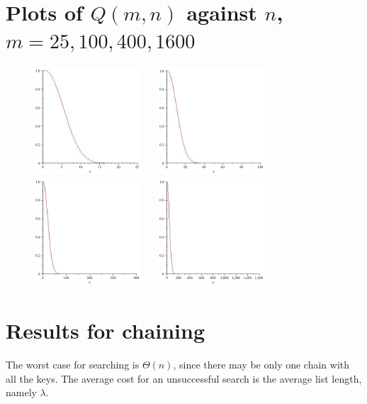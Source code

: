 \section{Plots of $Q(m, n)$ against $n$, $m=25,100,400,1600$}
\begin{figure}[htb]
\centering
\includegraphics[width=4cm]{figs/birthday25.jpg}
$\quad$
\includegraphics[width=4cm]{figs/birthday100.jpg}\\
\includegraphics[width=4cm]{figs/birthday400.jpg}
$\quad$
\includegraphics[width=4cm]{figs/birthday1600.jpg}
\end{figure}

\section{Results for chaining}
The worst case for searching is $\Theta(n)$, since there may be only one chain with all the keys. 
The average cost for an unsuccessful search is the average list length, namely $\lambda$.

